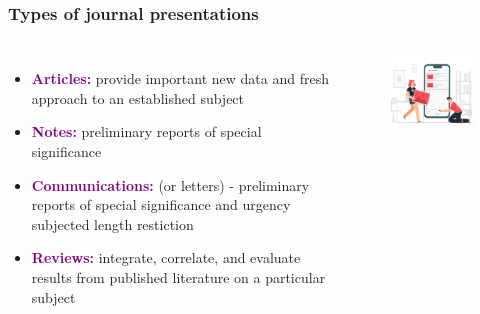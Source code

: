 \documentclass[newPxFont,sthlmFooter]{beamer}
\newcommand{\fs}{\footnotesize}
\begin{document}
\begin{frame}\frametitle{Types of journal presentations}
  \begin{columns}[T,onlytextwidth]
  \begin{itemize}
    \fs
    \item \textcolor{purple}{\bf Articles:} provide important new data and fresh approach to an established subject
    \item \textcolor{purple}{\bf Notes:} preliminary reports of special significance
    \item \textcolor{purple}{\bf Communications:} (or letters) - preliminary reports of special significance and urgency subjected length restiction
    \item \textcolor{purple}{\bf Reviews:} integrate, correlate, and evaluate results from published literature on a particular subject
  \end{itemize}
        \vspace{0.5cm}
  \begin{figure}
    \centering
    \includegraphics[width=2in]{figs/art} 
  \end{figure}
  \end{columns}
\end{frame}
\end{document}
